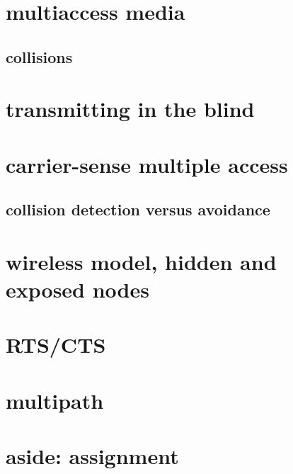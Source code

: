 \section{multiaccess media}



\subsection{collisions}


\section{transmitting in the blind}


\section{carrier-sense multiple access}


\subsection{collision detection versus avoidance}


\section{wireless model, hidden and exposed nodes} 


\section{RTS/CTS}


\section{multipath}



\section{aside: assignment}

